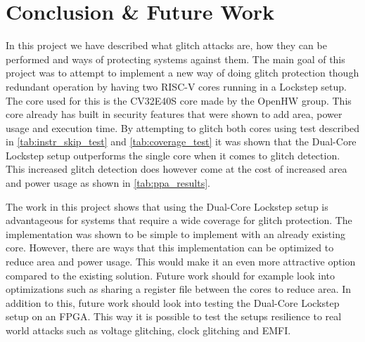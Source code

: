 \chapter{Conclusion \& Future Work}
\label{chap6}

In this project we have described what glitch attacks are, how they can be performed and ways of protecting systems against them. The main goal of this project was to attempt to implement a new way of doing glitch protection though redundant operation by having two RISC-V cores running in a Lockstep setup. The core used for this is the CV32E40S core made by the OpenHW group. This core already has built in security features that were shown to add area, power usage and execution time. By attempting to glitch both cores using test described in \autoref{tab:instr_skip_test} and \autoref{tab:coverage_test} it was shown that the Dual-Core Lockstep setup outperforms the single core when it comes to glitch detection. This increased glitch detection does however come at the cost of increased area and power usage as shown in \autoref{tab:ppa_results}. 

The work in this project shows that using the Dual-Core Lockstep setup is advantageous for systems that require a wide coverage for glitch protection. The implementation was shown to be simple to implement with an already existing core. However, there are ways that this implementation can be optimized to reduce area and power usage. This would make it an even more attractive option compared to the existing solution. Future work should for example look into optimizations such as sharing a register file between the cores to reduce area. In addition to this, future work should look into testing the Dual-Core Lockstep setup on an FPGA. This way it is possible to test the setups resilience to real world attacks such as voltage glitching, clock glitching and EMFI. 